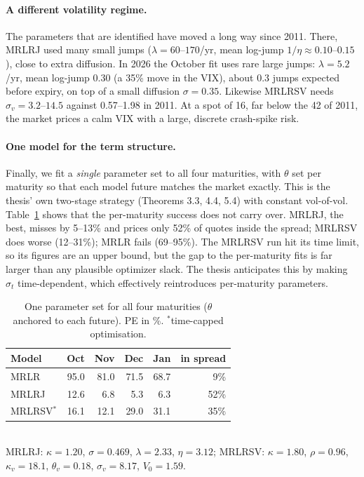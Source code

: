 \documentclass[10pt,twocolumn]{article}
\begin{document}
\paragraph{A different volatility regime.} The parameters that are identified have
moved a long way since 2011. There, MRLRJ used many small jumps
($\lambda=60$--$170$/yr, mean log-jump $1/\eta\approx0.10$--$0.15$), close to extra
diffusion. In 2026 the October fit uses rare large jumps: $\lambda=5.2$/yr, mean log-jump
$0.30$ (a 35\% move in the VIX), about 0.3 jumps expected before expiry, on top of a
small diffusion $\sigma=0.35$. Likewise MRLRSV needs $\sigma_v=3.2$--$14.5$ against
0.57--1.98 in 2011. At a spot of 16, far below the 42 of 2011, the market prices a
calm VIX with a large, discrete crash-spike risk.

\paragraph{One model for the term structure.} Finally, we fit a \emph{single} parameter set
to all four maturities, with $\theta$ set per maturity so that each model future
matches the market exactly. This is the thesis' own two-stage strategy (Theorems
3.3, 4.4, 5.4) with constant vol-of-vol. Table~\ref{tab:joint} shows that the per-maturity
success does not carry over. MRLRJ, the best, misses by 5--13\% and prices only
52\% of quotes inside the spread; MRLRSV does worse (12--31\%); MRLR fails
(69--95\%). The MRLRSV run hit its time limit, so its figures are an upper bound, but
the gap to the per-maturity fits is far larger than any plausible optimizer slack.
The thesis anticipates this by making $\sigma_t$ time-dependent, which effectively
reintroduces per-maturity parameters.

\begin{table}[t]
\centering\small
\caption{One parameter set for all four maturities ($\theta$ anchored to each future).
PE in \%. $^\ast$time-capped optimisation.}
\label{tab:joint}
\setlength{\tabcolsep}{4pt}
\begin{tabular}{@{}l rrrr r@{}}
\toprule
Model & Oct & Nov & Dec & Jan & in spread\\
\midrule
MRLR & 95.0 & 81.0 & 71.5 & 68.7 & 9\%\\
MRLRJ & 12.6 & 6.8 & 5.3 & 6.3 & 52\%\\
MRLRSV$^\ast$ & 16.1 & 12.1 & 29.0 & 31.1 & 35\%\\
\bottomrule
\end{tabular}
\\[3pt]
\footnotesize MRLRJ: $\kappa=1.20$, $\sigma=0.469$, $\lambda=2.33$, $\eta=3.12$;
MRLRSV: $\kappa=1.80$, $\rho=0.96$, $\kappa_v=18.1$, $\theta_v=0.18$, $\sigma_v=8.17$, $V_0=1.59$.
\end{table}
\end{document}
